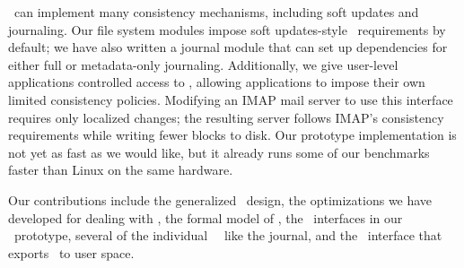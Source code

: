 \Patches\ can implement many consistency mechanisms, including
 soft updates and journaling.
%
Our file system modules impose soft updates-style \patch\
 requirements by default; we have also written a journal module that
 can set up dependencies for either full or metadata-only journaling. 
%
Additionally, we give user-level applications controlled access to \patches,
allowing applications to impose their own limited consistency
 policies.
%
Modifying an IMAP mail server to use this interface requires only localized
 changes; the resulting server follows IMAP's consistency
 requirements while writing fewer blocks to disk.
%
Our prototype implementation is not yet as fast as we would like, but it
 already runs some of our benchmarks faster than Linux on the same hardware.

\begin{comment}
 not ACID transactions: transactions should be independent, but any file
 system client can observe all active \patches), we believe that using
 \patches\ will allow the construction of consistent, modular, extensible
 file systems that are much easier to understand.
\end{comment}


Our contributions include the generalized \patch\ design, the
 optimizations we have developed for dealing with \patches, the formal
 model of \patches, the \module\ interfaces in our \Kudos\ prototype,
 several of the individual \Kudos\ \modules\ like the journal, and the
 \patchgroup\ interface that exports \patches\ to user space.


